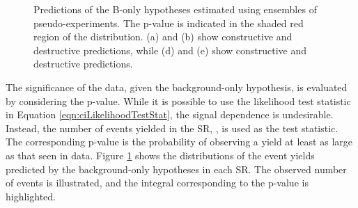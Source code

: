\begin{figure}[h!]
\captionsetup[subfigure]{position=b}
\centering
{}
\caption{Predictions of the B-only hypotheses estimated using ensembles of pseudo-experiments. The p-value is indicated in the shaded red region of the distribution. (a) and (b) show \ee constructive and destructive predictions, while (d) and (e) show \mm constructive and destructive predictions.}
\label{fig:ciSignificance}
\end{figure}

The significance of the data, given the background-only hypothesis, is evaluated by considering the p-value.
While it is possible to use the likelihood test statistic in Equation \ref{eqn:ciLikelihoodTestStat}, the signal dependence is undesirable.
Instead, the number of events yielded in the SR, \nobs, is used as the test statistic.
The corresponding p-value is the probability of observing a yield at least as large as that seen in data.
Figure \ref{fig:ciSignificance} shows the distributions of the event yields predicted by the background-only hypotheses in each SR.
The observed number of events is illustrated, and the integral corresponding to the p-value is highlighted.

